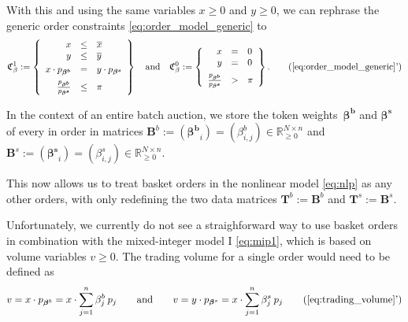 \documentclass[11pt,parskip=full]{scrartcl}%
\begin{document}
With this and using the same variables $x \ge 0$ and $y \ge 0$, we can rephrase the generic order
constraints \eqref{eq:order_model_generic} to
\begin{align}
  \mathfrak{C}^1_\beta := \left\{
  \begin{array}{rll}
    x &\le & \overline{x} \\
    y &\le & \overline{y} \\[1mm]
    x \cdot p_{\bm{\beta^b}} &= & y \cdot p_{\bm{\beta^s}} \\[2mm]
    \frac{p_{\bm{\beta^b}}}{p_{\bm{\beta^s}}} &\le & \pi
  \end{array}
  \right\}
  \quad
  \text{and}
  \quad
  \mathfrak{C}^0_\beta := \left\{
  \begin{array}{rll}
    x &= & 0 \\
    y &= & 0 \\[2mm]
    \frac{p_{\bm{\beta^b}}}{p_{\bm{\beta^s}}} &> & \pi
  \end{array}
  \right\}.
  \tag{\ref{eq:order_model_generic}'}
  \label{eq:basket_order_model_generic}
\end{align}

In the context of an entire batch auction, we store the token
weights~$\bm{\beta^b}$ and $\bm{\beta^s}$ of every in order in matrices
$\mathbf{B}^b := (\bm{\beta^b}_i) = (\beta^b_{i,j}) \in \mathbb{R}_{\ge 0}^{N \times n}$ and
$\mathbf{B}^s := (\bm{\beta^s}_i) = (\beta^s_{i,j}) \in \mathbb{R}_{\ge 0}^{N \times n}$.

This now allows us to treat basket orders in the nonlinear model \eqref{eq:nlp} as any other
orders, with only redefining the two data matrices
$\mathbf{T}^b := \mathbf{B}^b$ and $\mathbf{T}^s := \mathbf{B}^s$.

Unfortunately, we currently do not see a straighforward way to use basket orders in combination
with the mixed-integer model I \eqref{eq:mip1}, which is based on volume variables $v \ge 0$.
The trading volume for a single order would need to be defined as
\begin{align}
  v = x \cdot p_{\bm{\beta}^b} = x \cdot \sum\limits_{j=1}^n \beta_j^b \> p_j
  \qquad \text{and} \qquad
  v = y \cdot p_{\bm{\beta}^s} = x \cdot \sum\limits_{j=1}^n \beta_j^s \> p_j
  \tag{\ref{eq:trading_volume}'}
  \label{eq:basket_trading_volume}
\end{align}
\end{document}
